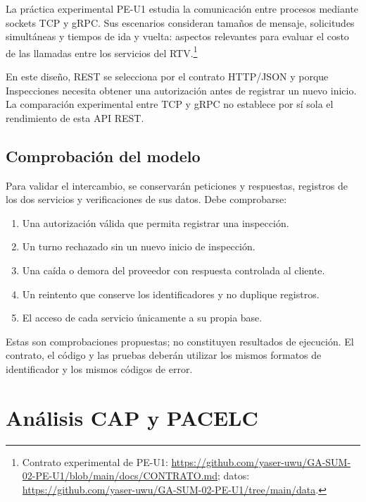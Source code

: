 \documentclass[11pt,a4paper]{article}
\begin{document}
La práctica experimental PE-U1 estudia la comunicación entre procesos mediante sockets TCP y gRPC. Sus escenarios consideran tamaños de mensaje, solicitudes simultáneas y tiempos de ida y vuelta: aspectos relevantes para evaluar el costo de las llamadas entre los servicios del RTV.\footnote{Contrato experimental de PE-U1: \url{https://github.com/yaser-uwu/GA-SUM-02-PE-U1/blob/main/docs/CONTRATO.md}; datos: \url{https://github.com/yaser-uwu/GA-SUM-02-PE-U1/tree/main/data}.}

En este diseño, REST se selecciona por el contrato HTTP/JSON y porque Inspecciones necesita obtener una autorización antes de registrar un nuevo inicio. La comparación experimental entre TCP y gRPC no establece por sí sola el rendimiento de esta API REST.

\subsection{Comprobación del modelo}

Para validar el intercambio, se conservarán peticiones y respuestas, registros de los dos servicios y verificaciones de sus datos. Debe comprobarse:

\begin{enumerate}[nosep]
  \item Una autorización válida que permita registrar una inspección.
  \item Un turno rechazado sin un nuevo inicio de inspección.
  \item Una caída o demora del proveedor con respuesta controlada al cliente.
  \item Un reintento que conserve los identificadores y no duplique registros.
  \item El acceso de cada servicio únicamente a su propia base.
\end{enumerate}

Estas son comprobaciones propuestas; no constituyen resultados de ejecución. El contrato, el código y las pruebas deberán utilizar los mismos formatos de identificador y los mismos códigos de error.

\section{Análisis CAP y PACELC}
\label{sec:cap}
\end{document}
